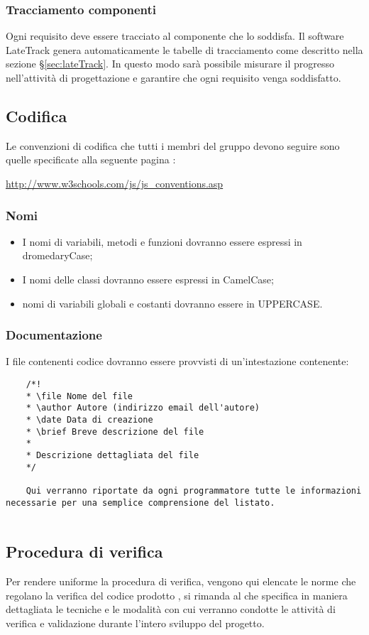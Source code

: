 	\subsubsection{Tracciamento componenti}
	Ogni requisito deve essere tracciato al componente che lo soddisfa. Il software LateTrack genera automaticamente le tabelle di tracciamento come descritto nella sezione \S\ref{sec:lateTrack}. In questo modo sarà possibile misurare il progresso nell'attività di progettazione e garantire che ogni requisito venga soddisfatto.
	\subsection{Codifica}
	Le convenzioni di codifica che tutti i membri del gruppo devono seguire sono quelle
	specificate alla seguente pagina :\\
	\begin{center} \url{http://www.w3schools.com/js/js_conventions.asp} \end{center}
	\subsubsection{Nomi}
	\begin{itemize}
	\item I nomi di variabili, metodi e funzioni dovranno essere espressi in dromedaryCase;
	\item I nomi delle classi dovranno essere espressi in CamelCase;
	\item nomi di variabili globali e costanti dovranno essere in UPPERCASE.
	\end{itemize}
	\subsubsection{Documentazione}
	I file contenenti codice dovranno essere provvisti di un'intestazione contenente:
	\begin{lstlisting}
    /*!
  	* \file Nome del file
  	* \author Autore (indirizzo email dell'autore)
  	* \date Data di creazione
  	* \brief Breve descrizione del file
  	*
  	* Descrizione dettagliata del file
  	*/
  	
  	Qui verranno riportate da ogni programmatore tutte le informazioni necessarie per una semplice comprensione del listato.
    
    \end{lstlisting}
   
   \subsection{Procedura di verifica}
   Per rendere uniforme la procedura di verifica, vengono qui elencate le norme che regolano la verifica del codice prodotto , si rimanda al \href{run:../../Esterni/\fPianoDiQualifica}{\fEscapePianoDiQualifica} che specifica in maniera dettagliata le tecniche e le modalità con cui verranno condotte le attività di verifica e validazione durante l’intero sviluppo del progetto.
   
